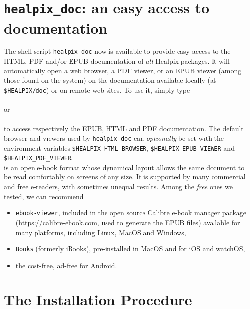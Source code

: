 \documentclass[12pt,twoside]{article}
\begin{document}
\section{\texttt{healpix\_doc}: an easy access to \healpix documentation}
The shell script \texttt{healpix\_doc} now is available to provide easy
access to the HTML, PDF and/or EPUB documentation of {\em all} Healpix packages.
It will automatically open a web browser, a PDF viewer, or an EPUB viewer (among those found on the
system) on the documentation
available locally (at \texttt{\$HEALPIX/doc}) or on remote web sites. To use it, simply type\\
\\
 or\\
\\
to access respectively the EPUB, HTML and PDF documentation. The default browser and
viewers used by \texttt{healpix\_doc} can {\em optionally} be set with the
environment variables
\texttt{\$HEALPIX\_HTML\_BROWSER}, 
\texttt{\$HEALPIX\_EPUB\_VIEWER} and
\texttt{\$HEALPIX\_PDF\_VIEWER}.\\
 is an open e-book format whose dynamical layout allows the same document to be read comfortably on 
screens of any size.
It is supported by many commercial and free e-readers, with sometimes unequal results.
Among the {\em free} ones we tested, we can recommend
\begin{itemize}
\item \texttt{ebook-viewer}, included in the open source Calibre e-book manager package 
(\url{https://calibre-ebook.com}, used to generate the \healpix EPUB files)
available for many platforms, including Linux, MacOS and Windows,
\item \texttt{Books} (formerly iBooks), pre-installed in MacOS and  for iOS and watchOS,
\item the cost-free, ad-free 
 for Android.
\end{itemize}



\section{The Installation Procedure}
\end{document}
